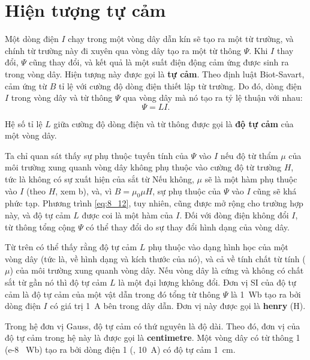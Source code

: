 \section{Hiện tượng tự cảm}\label{sec:8_5}

Một dòng điện $I$ chạy trong một vòng dây dẫn kín sẽ tạo ra một từ trường, và chính từ trường này đi xuyên qua vòng dây tạo ra một từ thông $\Psi$.
Khi $I$ thay đổi, $\Psi$ cũng thay đổi, và kết quả là một suất điện động cảm ứng được sinh ra trong vòng dây.
Hiện tượng này được gọi là \textbf{tự cảm}.
Theo định luật Biot-Savart, cảm ứng từ $B$ tỉ lệ với cường độ dòng điện thiết lập từ trường.
Do đó, dòng điện $I$ trong vòng dây và từ thông $\Psi$ qua vòng dây mà nó tạo ra tỷ lệ thuận với nhau:
\begin{equation}\label{eq:8_12}
	\Psi = L I.
\end{equation}

\noindent
Hệ số tỉ lệ $L$ giữa cường độ dòng điện và từ thông được gọi là \textbf{độ tự cảm} của một vòng dây.

Ta chỉ quan sát thấy sự phụ thuộc tuyến tính của $\Psi$ vào $I$ nếu độ từ thẩm $\mu$ của môi trường xung quanh vòng dây không phụ thuộc vào cường độ từ trường $H$, tức là không có sự xuất hiện của sắt từ
Nếu không, $\mu$ sẽ là một hàm phụ thuộc vào $I$ (theo $H$, xem b), và, vì $B=\mu_0\mu H$, sự phụ thuộc của $\Psi$ vào $I$ cũng sẽ khá phức tạp.
Phương trình \eqref{eq:8_12}, tuy nhiên, cũng được mở rộng cho trường hợp này, và độ tự cảm $L$ được coi là một hàm của $I$.
Đối với đòng điện không đổi $I$, từ thông tổng cộng $\Psi$ có thể thay đổi do sự thay đổi hình dạng của vòng dây.

Từ trên có thể thấy rằng độ tự cảm $L$ phụ thuộc vào dạng hình học của một vòng dây (tức là, về hình dạng và kích thước của nó), và cả về tính chất từ tính ($\mu$) của môi trường xung quanh vòng dây.
Nếu vòng dây là cứng và không có chất sắt từ gần nó thì độ tự cảm $L$ là một đại lượng không đổi.
Đơn vị SI của độ tự cảm là độ tự cảm của một vật dẫn trong đó tổng từ thông $\Psi$ là \SI{1}{\weber} tạo ra bởi dòng điện $I$ có giá trị \SI{1}{\ampere} bên trong dây dẫn. Đơn vị này được gọi là \textbf{henry} (\si{\henry}).

Trong hệ đơn vị Gauss, độ tự cảm có thứ nguyên là độ dài.
Theo đó, đơn vị của độ tự cảm trong hệ này là
được gọi là \textbf{centimetre}.
Một vòng dây có từ thông \SI{1}{\maxwell} (\SI{e-8
}{\weber}) tạo ra bởi dòng điện \SI{1}{} (\ie, \SI{10}{\ampere}) có độ tự cảm \SI{1}{\centi\metre}.

